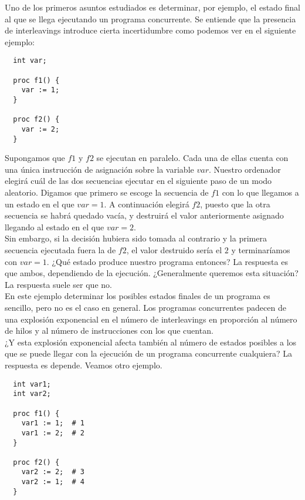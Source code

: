 Uno de los primeros asuntos estudiados es determinar, por ejemplo, el estado final al que se llega ejecutando un programa concurrente. Se entiende que la presencia de interleavings introduce cierta incertidumbre como podemos ver en el siguiente ejemplo:

\begin{lstlisting}
  int var;

  proc f1() {
    var := 1;
  }

  proc f2() {
    var := 2;
  }
\end{lstlisting}

Supongamos que $f1$ y $f2$ se ejecutan en paralelo. Cada una de ellas cuenta con una única instrucción de asignación sobre la variable $var$. Nuestro ordenador elegirá cuál de las dos secuencias ejecutar en el siguiente paso de un modo aleatorio. Digamos que primero se escoge la secuencia de $f1$ con lo que llegamos a un estado en el que $var = 1$. A continuación elegirá $f2$, puesto que la otra secuencia se habrá quedado vacía, y destruirá el valor anteriormente asignado llegando al estado en el que $var = 2$.\\

Sin embargo, si la decisión hubiera sido tomada al contrario y la primera secuencia ejecutada fuera la de $f2$, el valor destruido sería el $2$ y terminaríamos con $var = 1$. ¿Qué estado produce nuestro programa entonces? La respuesta es que ambos, dependiendo de la ejecución. ¿Generalmente queremos esta situación? La respuesta suele ser que no.\\

En este ejemplo determinar los posibles estados finales de un programa es sencillo, pero no es el caso en general. Los programas concurrentes padecen de una explosión exponencial en el número de interleavings en proporción al número de hilos y al número de instrucciones con los que cuentan.\\

¿Y esta explosión exponencial afecta también al número de estados posibles a los que se puede llegar con la ejecución de un programa concurrente cualquiera? La respuesta es depende. Veamos otro ejemplo.

\begin{lstlisting}
  int var1;
  int var2;

  proc f1() {
    var1 := 1;  # 1
    var1 := 2;  # 2
  }

  proc f2() {
    var2 := 2;  # 3
    var2 := 1;  # 4
  }
\end{lstlisting}

